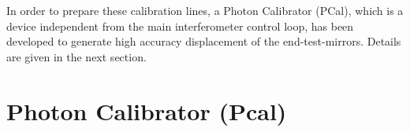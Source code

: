 In order to prepare these calibration lines, a Photon Calibrator (PCal), which is a device independent from the main interferometer control loop, has been developed to generate high accuracy displacement of the end-test-mirrors. Details are given in the next section.







%
%
%
%
%
%


\section{Photon Calibrator (Pcal)}
